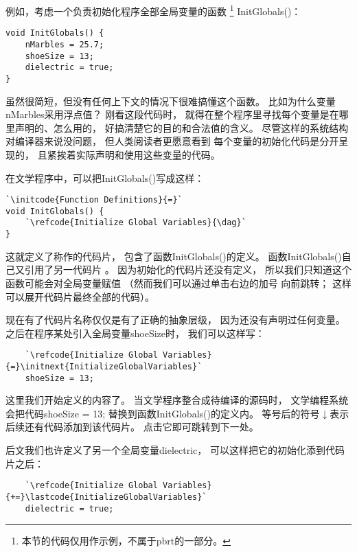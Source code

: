 例如，考虑一个负责初始化程序全部全局变量的函数
\footnote{本节的代码仅用作示例，不属于pbrt的一部分。}
{\ttfamily InitGlobals()}：
\begin{lstlisting}
void InitGlobals() {
    nMarbles = 25.7;
    shoeSize = 13;
    dielectric = true;
}
\end{lstlisting}

虽然很简短，但没有任何上下文的情况下很难搞懂这个函数。
比如为什么变量{\ttfamily nMarbles}采用浮点值？
刚看这段代码时，
就得在整个程序里寻找每个变量是在哪里声明的、怎么用的，
好搞清楚它的目的和合法值的含义。
尽管这样的系统结构对编译器来说没问题，
但人类阅读者更愿意看到
每个变量的初始化代码是分开呈现的，
且紧挨着实际声明和使用这些变量的代码。

在文学程序中，可以把{\ttfamily InitGlobals()}写成这样：
\begin{lstlisting}
`\initcode{Function Definitions}{=}`
void InitGlobals() {
    `\refcode{Initialize Global Variables}{\dag}`
}
\end{lstlisting}

这就定义了称作的代码片，
包含了函数{\ttfamily InitGlobals()}的定义。
函数{\ttfamily InitGlobals()}自己又引用了另一代码片
。
因为初始化的代码片还没有定义，
所以我们只知道这个函数可能会对全局变量赋值
（然而我们可以通过单击右边的加号
向前跳转；
这样可以展开代码片最终全部的代码）。

现在有了代码片名称仅仅是有了正确的抽象层级，
因为还没有声明过任何变量。
之后在程序某处引入全局变量{\ttfamily shoeSize}时，
我们可以这样写：
\begin{lstlisting}
    `\refcode{Initialize Global Variables}{=}\initnext{InitializeGlobalVariables}`
    shoeSize = 13;
\end{lstlisting}

这里我们开始定义的内容了。
当文学程序整合成待编译的源码时，
文学编程系统会把代码{\ttfamily shoeSize = 13;}
替换到函数{\ttfamily InitGlobals()}的定义内。
等号后的符号{\codecolor $\downarrow$}表示后续还有代码添加到该代码片。
点击它即可跳转到下一处。

后文我们也许定义了另一个全局变量{\ttfamily dielectric}，
可以这样把它的初始化添到代码片之后：
\begin{lstlisting}
    `\refcode{Initialize Global Variables}{+=}\lastcode{InitializeGlobalVariables}`
    dielectric = true;
\end{lstlisting}

